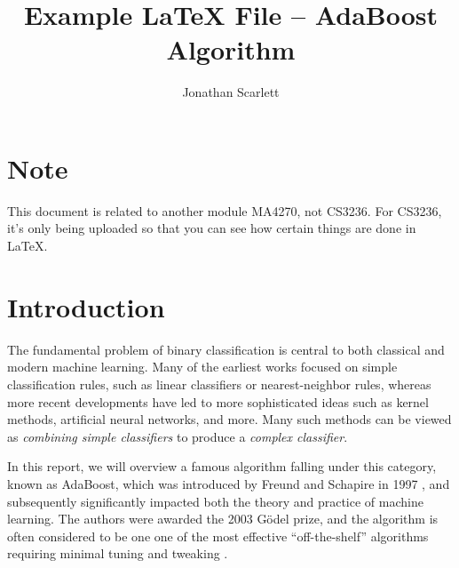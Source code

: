 \documentclass[english]{article}
\title{Example LaTeX File -- AdaBoost Algorithm}
\date{}
\author{Jonathan Scarlett}
\begin{document}
\maketitle

{\color{red} 
\section*{Note}

This document is related to another module MA4270, not CS3236.  For CS3236, it's only being uploaded so that you can see how certain things are done in LaTeX.
}

\section{Introduction} \label{sec:intro}

The fundamental problem of binary classification is central to both classical and modern machine learning.  Many of the earliest works focused on simple classification rules, such as linear classifiers or nearest-neighbor rules, whereas more recent developments have led to more sophisticated ideas such as kernel methods, artificial neural networks, and more.  Many such methods can be viewed as {\em combining simple classifiers} to produce a {\em complex classifier}.

In this report, we will overview a famous algorithm falling under this category, known as AdaBoost, which was introduced by Freund and Schapire in 1997 \cite{freund1997decision}, and subsequently significantly impacted both the theory and practice of machine learning.  The authors were awarded the 2003 G\"odel prize, and the algorithm is often considered to be one one of the most effective ``off-the-shelf'' algorithms requiring minimal tuning and tweaking \cite{blog,wiki}.
\end{document}
